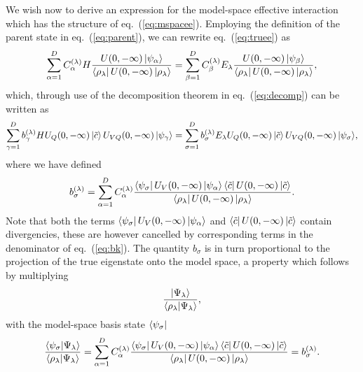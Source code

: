 We wish now to derive an expression for the model-space effective 
interaction which has the structure of eq.\ (\ref{eq:mspacee}). 
Employing the definition of the parent state in eq.\ (\ref{eq:parent}),
we can rewrite eq.\ (\ref{eq:truee}) as
\begin{equation}
    {\displaystyle \sum_{\alpha =1}^{D}C_{\alpha}^{(\lambda )}
    H\frac{U(0,-\infty )\left| \psi_{\alpha} \right\rangle }
    { \left\langle \rho_{\lambda} \right| U(0,-\infty )\left| \rho_{\lambda} \right\rangle }=
    \sum_{\beta =1}^{D}C_{\beta}^{(\lambda )}
    E_{\lambda}\frac{U(0,-\infty )\left| \psi_{\beta} \right\rangle }
    { \left\langle \rho_{\lambda} \right| U(0,-\infty )\left| \rho_{\lambda} \right\rangle }},
    \label{eq:truee1}
\end{equation}
which, through use of the decomposition theorem in eq.\ (\ref{eq:decomp}) 
can be written as
\begin{equation}
{\displaystyle \sum_{\gamma=1}^{D}b_{\gamma}^{(\lambda )}
HU_Q(0,-\infty )\left| \tilde{c} \right\rangle U_{VQ}(0,-\infty )\left| \psi_{\gamma} \right\rangle=
\sum_{\sigma =1}^{D}b_{\sigma}^{(\lambda )}E_{\lambda}
U_Q(0,-\infty )\left| \tilde{c} \right\rangle U_{VQ}(0,-\infty )\left| \psi_{\sigma} \right\rangle},
\label{eq:truee2}
\end{equation}
where we have defined 
\begin{equation}
b_{\sigma}^{(\lambda )}=
{\displaystyle \sum_{\alpha =1}^{D}C_{\alpha}^{(\lambda )}
\frac{\left\langle \psi_{\sigma} \right|U_V(0,-\infty )\left| \psi_{\alpha} \right\rangle
\left\langle \tilde{c} \right|U(0,-\infty )\left| \tilde{c} \right\rangle}
{ \left\langle \rho_{\lambda} \right| U(0,-\infty )\left| \rho_{\lambda} \right\rangle }}.
\label{eq:bk}
\end{equation}
Note that both the terms 
$\left\langle \psi_{\sigma} \right|U_V(0,-\infty )\left| \psi_{\alpha} \right\rangle $ and
$\left\langle \tilde{c} \right|U(0,-\infty )\left| \tilde{c} \right\rangle$ contain
divergencies, these are however cancelled by corresponding terms in the
denominator of eq.\ (\ref{eq:bk}). The quantity $b_{\sigma}$ 
is in turn proportional
to the projection of the true eigenstate onto the model space, a property
which follows by multiplying 
\begin{equation}
    \frac{\left| \Psi_{\lambda} \right\rangle}
    {\left\langle\rho_{\lambda} | \Psi_{\lambda} \right\rangle},
\end{equation}
with the model-space basis state $\left\langle \psi_{\sigma} \right|$
\begin{equation}
    \frac{\left\langle\psi_{\sigma} | \Psi_{\lambda} \right\rangle }
    {\left\langle\rho_{\lambda} | \Psi_{\lambda} \right\rangle}=
    {\displaystyle \sum_{\alpha =1}^{D}C_{\alpha}^{(\lambda )}
    \frac{\left\langle \psi_{\sigma} \right|U_V(0,-\infty )\left| \psi_{\alpha} \right\rangle 
    \left\langle \tilde{c} \right|U(0,-\infty )\left| \tilde{c} \right\rangle}
    { \left\langle \rho_{\lambda} \right| U(0,-\infty )\left| \rho_{\lambda} \right\rangle }}=
    b_{\sigma}^{(\lambda )}.
    \label{eq:bk1}
\end{equation}
